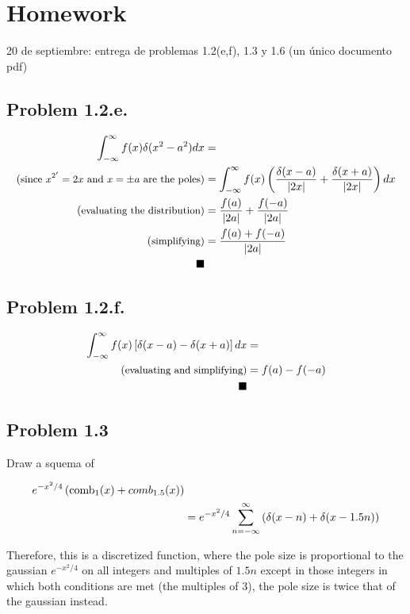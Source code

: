 \documentclass[../main/main.tex]{subfiles}
\begin{document}
\section{Homework}

20 de septiembre: entrega de problemas 1.2(e,f), 1.3 y 1.6 (un único documento pdf)
\subsection*{Problem 1.2.e.}

\begin{align*}
\int _{-\infty}^{\infty}f(x) \delta (x^{2} - a^{2}) d x  &= \\
\textrm{(\small since $x^{2'} = 2x$ and $x=\pm a$ are the poles)}
	&= \int _{-\infty}^{\infty}f(x)\left( \frac{\delta (x-a)}{|2x|} + \frac{\delta(x+a)}{|2x|}\right) d x\\
\textrm{(\small evaluating the distribution)}
	&=\frac{f(a)}{|2a|} + \frac{f(-a)}{|2a|}\\
\textrm{(\small simplifying)}
	&= \frac{f(a) + f(-a)}{|2a|}\\ \qed
\end{align*}

\subsection*{Problem 1.2.f.}

\begin{align*}
\int _{-\infty}^{\infty}f(x) \left[\delta(x-a) - \delta(x+a)\right]d x  &= \\
\textrm{(\small evaluating and simplifying)}
	&=f(a) - f(-a) \\
	\qed
\end{align*}

\pagebreak
\subsection*{Problem 1.3}

Draw a squema of 

\begin{align*}
e^{-x^{2}/4}\left(\textrm{comb}_{1}(x) + comb_{1.5}(x)\right)&\\
&=e^{-x^{2}/4}\sum_{n=-\infty}^{\infty}\left(\delta(x-n) +\delta(x-1.5n)\right)
\end{align*}

Therefore, this is a discretized function, where the pole size is proportional to the gaussian  $e^{-x^{2}/4}$ on all integers and multiples of $1.5n$ except in those integers in which both conditions are met (the multiples of 3), the pole size is twice that of the gaussian instead. 
\end{document}
